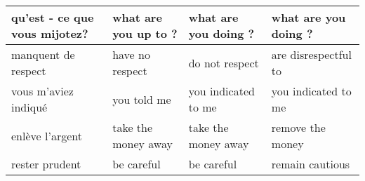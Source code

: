 \documentclass[11pt,a4paper]{article}
\begin{document}
\begin{table*}[]
\begin{tabular}{|p{3.5cm}|p{3.5cm}|p{3.5cm}|p{3.5cm}|}
qu'est - ce que vous mijotez?                                                                                                                     & what are you up to ?                                                                                                         & what are you doing ?                                                                                                                                & what are you doing ?                                                                                                                              \\ \hline
manquent de respect                                                                                                                               & have no respect                                                                                                              & do not respect                                                                                                                                      & are disrespectful to                                                                                                                              \\ \hline
vous m'aviez indiqu{\'e}                                                     & you told me                                                   & you indicated to me                                                                 & you indicated to me                                                               \\ \hline
enl{\`e}ve l'argent                                                                                                                     & take the money away                                                                                       & take the money away                                                                                                              & remove the money                                                                                                              \\ \hline
rester prudent                                                                                                                                    & be careful                                                                                                                   & be careful                                                                                                                                          & remain cautious                                                                                                                                   \\ \hline

\end{tabular}
\end{table*}
\end{document}
